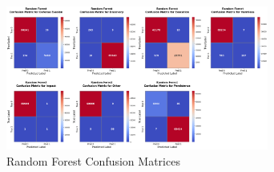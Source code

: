         
        \clearpage

        
        \begin{figure}[H]
        
            \centering
            
            \begin{minipage}{\textwidth}
                \centering
                \begin{minipage}[c]{\textwidth}
                    \centering
                    \includegraphics[width=0.77\textwidth]{../figures/plots/section2/Random_Forest_normalized_confusion_matrix_test.png}
                    \caption{Random Forest Confusion Matrices}
                    \label{fig:rf_cm_base}
                \end{minipage}%
            \end{minipage}

            \vspace{0.5cm}  %
            

\end{figure}
